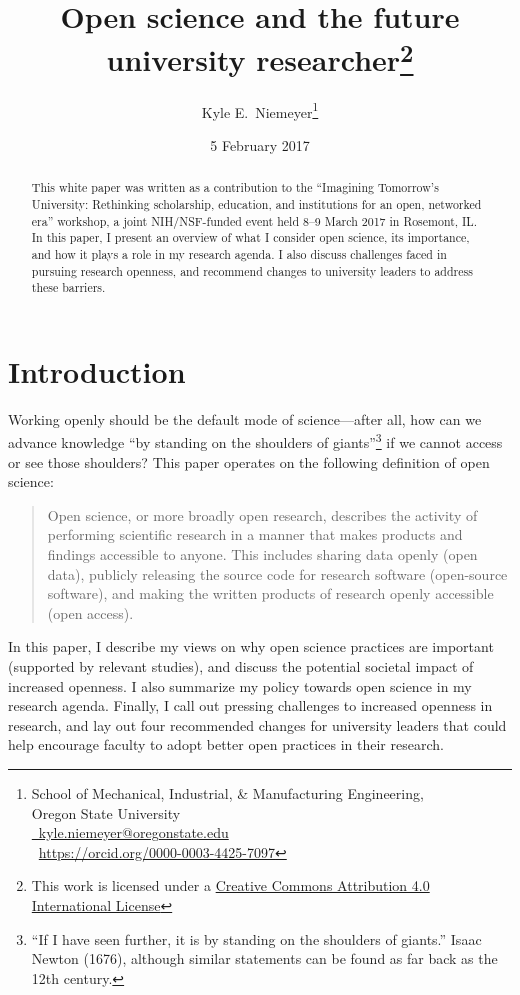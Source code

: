 \documentclass[nobib]{tufte-handout}
\title{Open science and the future university researcher\thanks{This
work is licensed under a
\href{https://creativecommons.org/licenses/by/4.0/}{Creative Commons Attribution
4.0 International License} \ccby}}
\author[Kyle E.~Niemeyer]{Kyle E.~Niemeyer\thanks{
School of Mechanical, Industrial, \& Manufacturing Engineering,\\
\noindent Oregon State University\\
\noindent \href{mailto:kyle.niemeyer@oregonstate.edu}{\faEnvelopeO{}~kyle.niemeyer@oregonstate.edu}\\
\noindent \href{https://orcid.org/}{\inlinegraphics{orcid_128x128.png}}~{\scriptsize\href{https://orcid.org/0000-0003-4425-7097}{https://orcid.org/0000-0003-4425-7097}}
}}
\date{5 February 2017} %
\begin{document}
\maketitle%

\begin{abstract}
\noindent
This white paper was written as a contribution to the ``Imagining Tomorrow's University:
Rethinking scholarship, education, and institutions for an open, networked era''
workshop, a joint NIH\slash NSF-funded event held 8--9 March 2017 in Rosemont, IL.
In this paper, I present an overview of what I consider open science,
its importance, and how it plays a role in my research agenda.
I also discuss challenges faced in pursuing research openness, and
recommend changes to university leaders to address these barriers.
\end{abstract}

\section{Introduction}
\label{sec:intro}

Working openly should be the default mode of science---after all, how can
we advance knowledge ``by standing on the shoulders of giants''\footnote{``If I
have seen further, it is by standing on the shoulders of giants.'' Isaac
Newton (1676), although similar statements can be found as far back as the 12th
century.} if we cannot access or see those shoulders? This paper operates
on the following definition of open science:
\begin{quote}
Open science, or more broadly open research, describes the activity of performing
scientific research in a manner that makes products and findings accessible to
anyone. This includes sharing data openly (open data), publicly releasing the
source code for research software (open-source software), and making the written
products of research openly accessible (open access).
\end{quote}
In this paper, I describe my views on why open science practices are important
(supported by relevant studies), and discuss the potential societal impact of
increased openness. I also summarize my policy towards open science in my
research agenda. Finally, I call out pressing challenges to increased openness
in research, and lay out four recommended changes for university leaders that
could help encourage faculty to adopt better open practices in their research.
\end{document}
